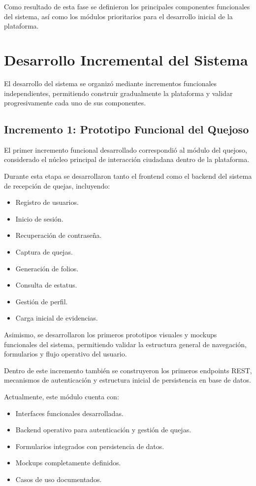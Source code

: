 Como resultado de esta fase se definieron los principales componentes funcionales del sistema, así como los módulos prioritarios para el desarrollo inicial de la plataforma.

\section{Desarrollo Incremental del Sistema}

El desarrollo del sistema se organizó mediante incrementos funcionales independientes, permitiendo construir gradualmente la plataforma y validar progresivamente cada uno de sus componentes.

\subsection{Incremento 1: Prototipo Funcional del Quejoso}

El primer incremento funcional desarrollado correspondió al módulo del quejoso, considerado el núcleo principal de interacción ciudadana dentro de la plataforma.

Durante esta etapa se desarrollaron tanto el frontend como el backend del sistema de recepción de quejas, incluyendo:

\begin{itemize}
    \item Registro de usuarios.
    \item Inicio de sesión.
    \item Recuperación de contraseña.
    \item Captura de quejas.
    \item Generación de folios.
    \item Consulta de estatus.
    \item Gestión de perfil.
    \item Carga inicial de evidencias.
\end{itemize}

Asimismo, se desarrollaron los primeros prototipos visuales y mockups funcionales del sistema, permitiendo validar la estructura general de navegación, formularios y flujo operativo del usuario.

Dentro de este incremento también se construyeron los primeros endpoints REST, mecanismos de autenticación y estructura inicial de persistencia en base de datos.

Actualmente, este módulo cuenta con:

\begin{itemize}
    \item Interfaces funcionales desarrolladas.
    \item Backend operativo para autenticación y gestión de quejas.
    \item Formularios integrados con persistencia de datos.
    \item Mockups completamente definidos.
    \item Casos de uso documentados.
\end{itemize}

